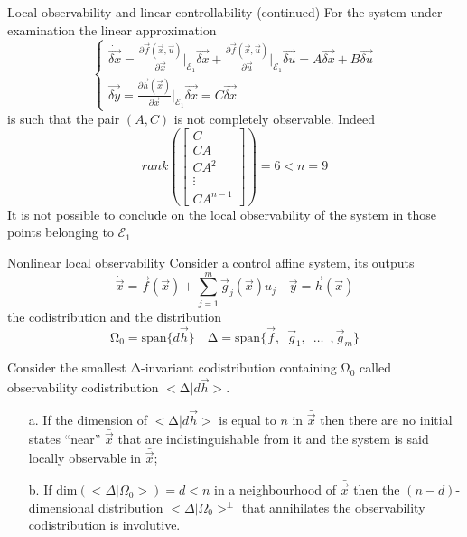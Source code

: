 \begin{frame}{Local observability and linear controllability (continued)}
  For the system under examination the linear approximation
  \[
  \begin{cases}
    \dot{\vec{\delta x}} = \frac{\partial{\vec{f}(\vec{x},\vec{u})}}{\partial{\vec{x}}}\Big|_{\mathcal{E}_1} \vec{\delta x} +
    \frac{\partial{\vec{f}(\vec{x},\vec{u})}}{\partial{\vec{u}}}\Big|_{\mathcal{E}_1} \vec{\delta u} = A \vec{\delta x} + B \vec{\delta u}\\
    \vec{\delta y} = \frac{\partial{\vec{h}(\vec{x})}}{\partial{\vec{x}}}\Big|_{\mathcal{E}_1} \vec{\delta x}= C \vec{\delta x}
  \end{cases}
  \]
  is such that the pair $(A, C)$ is not completely observable. Indeed
  \[
  rank\left(
  \begin{bmatrix}
    C \\ CA \\ CA^2 \\ \vdots \\ CA^{n-1}
  \end{bmatrix}
  \right) = 6 < n = 9
  \]
  It is not possible to conclude on the local observability of the system
  in those points belonging to $\mathcal{E}_1$
\end{frame}

\begin{frame}{Nonlinear local observability}
  \small
  Consider a control affine system, its outputs
  \[
    \dot{\vec{x}} = \vec{f}(\vec{x}) + \sum\limits_{j=1}^{m}\vec{g}_j(\vec{x}) u_{j} \quad \vec{y} = \vec{h}(\vec{x})
  \]
  the codistribution and the distribution
  \[
  \mathrm{\Omega}_0 = \mathrm{span} \{ d \vec{h}\} \quad \mathrm{\Delta}= \mathrm{span} \{\vec{f},\enspace\vec{g}_1, \enspace \hdots \enspace, \vec{g}_m\}
  \]
  \begin{theorem}
    Consider the smallest $\mathrm{\Delta}$-invariant codistribution containing $\mathrm{\Omega}_0$ called
    observability codistribution $< \mathrm{\Delta} | d\vec{h} >$.
    \begin{itemize}
    \item[a.]If the dimension of $< \mathrm{\Delta}|d\vec{h} >$ is equal to $n$ in $\bar{\vec{x}}$ then
      there are no initial states ``near'' $\bar{\vec{x}}$ that are indistinguishable from
      it and the system is said locally observable in $\bar{\vec{x}}$;
    \item[b.]If $\text{dim}(< \Delta|\Omega_0 >) = d < n$ in a neighbourhood of $\bar{\vec{x}}$ then
      the $(n-d)$-dimensional distribution $< \Delta|\Omega_0 >^{\perp}$ that annihilates
      the observability codistribution is involutive.
    \end{itemize}
  \end{theorem}
\end{frame}

